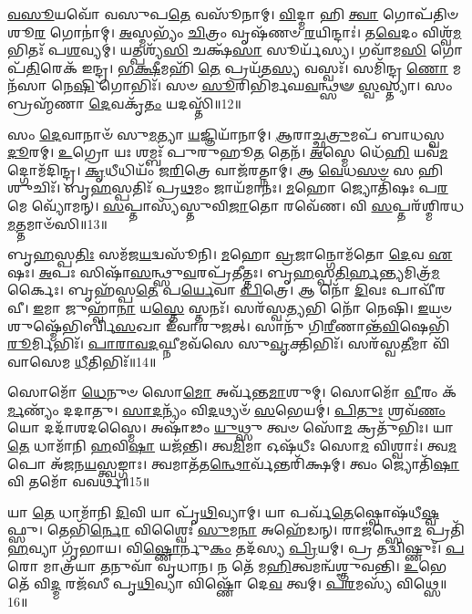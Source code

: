 \-\ul{𑌵}\-\-\ul{𑌸𑍂}\-𑌯𑌵𑍋᳴ 𑌵𑌸𑍁𑌪\-\ul{𑌤𑍇} 𑌵𑌸𑍂᳴𑌨𑌾𑌮𑍍।
\-\ul{𑌵𑌿}\-𑌦𑍍𑌮𑌾 𑌹𑌿 \ul{𑌤𑍍𑌵𑌾} 𑌗𑍋𑌪᳴𑌤𑌿𑍞 𑌶𑍂\-\ul{𑌰} 𑌗𑍋𑌨𑌾॑𑌮𑍍।
\-\ul{𑌅}\-𑌸𑍍𑌮𑌭𑍍𑌯𑌂᳴ \ul{𑌚𑌿}\-𑌤𑍍𑌰𑌂 𑌵𑍃𑌷᳴𑌣𑍞 \ul{𑌰}\-𑌯𑌿𑌨𑍍𑌦𑌾𑌃॑।
𑌤\-\ul{𑌵𑍇}\-𑌦𑌂 𑌵𑌿𑌶𑍍𑌵᳴\-\ul{𑌮}\-𑌭𑌿𑌤𑌃᳴ 𑌪\-\ul{𑌶}\-𑌵𑍍𑌯𑌮𑍍॑।
𑌯𑌤𑍍𑌪𑌶𑍍𑌯᳴\-\ul{𑌸𑌿} 𑌚𑌕𑍍𑌷᳴\-\ul{𑌸𑌾} 𑌸𑍂𑌰𑍍𑌯᳴𑌸𑍍𑌯।
𑌗𑌵𑌾᳴𑌮\-\ul{𑌸𑌿} 𑌗𑍋𑌪᳴\-\ul{𑌤𑌿}\-𑌰𑍇𑌕᳴ 𑌇𑌨𑍍𑌦𑍍𑌰।
\-\ul{𑌭}\-\-\ul{𑌕𑍍𑌷𑍀}\-𑌮𑌹𑌿᳴ \ul{𑌤𑍇} 𑌪𑍍𑌰𑌯᳴𑌤\-\ul{𑌸𑍍𑌯} 𑌵𑌸𑍍𑌵𑌃᳴।
𑌸𑌮𑌿᳴𑌨𑍍𑌦𑍍𑌰 \ul{𑌣𑍋} 𑌮𑌨᳴𑌸𑌾 𑌨𑍇\-\ul{𑌷𑌿} 𑌗𑍋𑌭𑌿𑌃᳴।
𑌸𑍞 \ul{𑌸𑍂}\-𑌰𑌿𑌭𑌿᳴𑌰𑍍𑌮𑌘\-\ul{𑌵}\-𑌨𑍍𑌥𑍍𑌸𑍟 \ul{𑌸𑍍𑌵}\-𑌸𑍍𑌤𑍍𑌯𑌾।
𑌸𑌂 𑌬𑍍𑌰𑌹𑍍𑌮᳴𑌣𑌾 \ul{𑌦𑍇}\-𑌵𑌕𑍃᳴\-\ul{𑌤𑌂} 𑌯𑌦𑌸𑍍𑌤𑌿᳴॥12॥

𑌸𑌂 \ul{𑌦𑍇}\-𑌵𑌾𑌨𑌾𑍞᳴ 𑌸𑍁\-\ul{𑌮}\-𑌤𑍍𑌯𑌾 \ul{𑌯}\-𑌜𑍍𑌞𑌿𑌯𑌾᳴𑌨𑌾𑌮𑍍।
\-\ul{𑌆}\-𑌰𑌾𑌚𑍍𑌛\-\ul{𑌤𑍍𑌰𑍁}\-𑌮𑌪᳴ 𑌬𑌾𑌧𑌸𑍍𑌵 \ul{𑌦𑍂}\-𑌰𑌮𑍍।
\-\ul{𑌉}\-𑌗𑍍𑌰𑍋 𑌯𑌃 𑌶𑌮𑍍𑌬𑌃᳴ 𑌪𑍁𑌰𑍁𑌹𑍂\-\ul{𑌤} 𑌤𑍇𑌨᳴।
\-\ul{𑌅}\-𑌸𑍍𑌮𑍇 𑌧𑍇᳴\-\ul{𑌹𑌿} 𑌯𑌵᳴\-\ul{𑌮}\-𑌦𑍍𑌗𑍋𑌮᳴𑌦𑌿𑌨𑍍𑌦𑍍𑌰।
\-\ul{𑌕𑍃}\-𑌧𑍀𑌧𑌿𑌯𑌂᳴ 𑌜\-\ul{𑌰𑌿}\-𑌤𑍍𑌰𑍇 𑌵𑌾𑌜᳴𑌰𑌤𑍍𑌨𑌾𑌮𑍍।
𑌆 \ul{𑌵𑍇}\-𑌧\-\ul{𑌸}\-\-\ul{𑍞} 𑌸 𑌹𑌿 𑌶𑍁𑌚𑌿𑌃᳴।
𑌬𑍃\-\ul{𑌹}\-𑌸𑍍𑌪𑌤𑌿𑌃᳴ 𑌪𑍍𑌰\-\ul{𑌥}\-𑌮𑌂 𑌜𑌾𑌯᳴𑌮𑌾𑌨𑌃।
\-\ul{𑌮}\-𑌹𑍋 𑌜𑍍𑌯𑍋𑌤𑌿᳴𑌷𑌃 𑌪\-\ul{𑌰}\-𑌮𑍇 𑌵𑍍𑌯𑍋᳴𑌮𑌨𑍍।
\-\ul{𑌸}\-𑌪𑍍𑌤𑌾𑌸𑍍𑌯᳴𑌸𑍍𑌤𑍁𑌵𑌿\-\ul{𑌜𑌾}\-𑌤𑍋 𑌰𑌵𑍇᳴𑌣।
𑌵𑌿 \ul{𑌸}\-𑌪𑍍𑌤𑌰᳴𑌶𑍍𑌮𑌿𑌰𑌧\-\ul{𑌮}\-𑌤𑍍𑌤𑌮𑌾𑍞᳴𑌸𑌿॥13॥

𑌬𑍃\-\ul{𑌹}\-𑌸𑍍𑌪\-\ul{𑌤𑌿𑌃} 𑌸𑌮᳴𑌜\-\ul{𑌯}\-𑌦𑍍𑌵𑌸𑍂᳴𑌨𑌿।
\-\ul{𑌮}\-𑌹𑍋 \ul{𑌵𑍍𑌰}\-𑌜𑌾𑌨𑍍𑌗𑍋𑌮᳴𑌤𑍋 \ul{𑌦𑍇}\-𑌵 \ul{𑌏}\-𑌷𑌃।
\-\ul{𑌅}\-𑌪𑌃 𑌸𑌿𑌷𑌾᳴\-\ul{𑌸}\-𑌨𑍍𑌥𑍍𑌸𑍁\-\ul{𑌵}\-𑌰𑌪𑍍𑌰᳴𑌤𑍀𑌤𑍍𑌤𑌃।
𑌬𑍃\-\ul{𑌹}\-𑌸𑍍𑌪\-\ul{𑌤𑌿}\-\-\ul{𑌰𑍍}\-𑌹\-\ul{𑌨𑍍𑌤𑍍𑌯}\-𑌮𑌿𑌤𑍍𑌰᳴\-\ul{𑌮}\-𑌰𑍍𑌕𑍈𑌃।
𑌬𑍃𑌹᳴𑌸𑍍𑌪\-\ul{𑌤𑍇} 𑌪\-\ul{𑌰𑍍𑌯𑍇}\-𑌵𑌾 \ul{𑌪𑌿}\-𑌤𑍍𑌰𑍇।
𑌆 𑌨𑍋᳴ \ul{𑌦𑌿}\-𑌵𑌃 𑌪𑌾𑌵𑍀᳴𑌰𑌵𑍀।
\-\ul{𑌇}\-𑌮𑌾 𑌜𑍁𑌹𑍍𑌵𑌾᳴\-\ul{𑌨𑌾} 𑌯\-\ul{𑌸𑍍𑌤𑍇} 𑌸𑍍𑌤𑌨𑌃᳴।
𑌸𑌰᳴𑌸𑍍𑌵\-\ul{𑌤𑍍𑌯}\-𑌭𑌿 𑌨𑍋᳴ 𑌨𑍇𑌷𑌿।
\-\ul{𑌇}\-𑌯𑍞 𑌶𑍁𑌷𑍍𑌮𑍇᳴𑌭𑌿𑌰𑍍𑌬𑌿\-\ul{𑌸}\-𑌖𑌾 𑌇᳴𑌵𑌾𑌰𑍁𑌜𑌤𑍍।
𑌸𑌾𑌨𑍁᳴ 𑌗𑌿\-\ul{𑌰𑍀}\-𑌣𑌾𑌨𑍍𑌤᳴\-\ul{𑌵𑌿}\-𑌷𑍇𑌭𑌿᳴\-\ul{𑌰𑍂}\-𑌰𑍍𑌮𑌿𑌭𑌿𑌃᳴।
\-\ul{𑌪𑌾}\-\-\ul{𑌰𑌾}\-\-\ul{𑌵}\-\-\ul{𑌦}\-𑌘𑍍𑌨𑍀𑌮𑌵᳴𑌸𑍇 𑌸𑍁\-\ul{𑌵𑍃}\-𑌕𑍍𑌤𑌿𑌭𑌿𑌃᳴।
𑌸𑌰᳴𑌸𑍍𑌵\-\ul{𑌤𑍀}\-𑌮𑌾 𑌵𑌿᳴𑌵𑌾𑌸𑍇𑌮 \ul{𑌧𑍀}\-𑌤𑌿𑌭𑌿𑌃᳴॥14॥\anuvakamend[\-\ul{𑌦𑍇}\-\-\ul{𑌵}\-𑌯𑌾𑌨𑍈॑\-\ul{𑌰𑍍𑌦𑍇}\-𑌵𑌾𑌃 𑌸𑍁𑌪𑍂᳴𑌤𑌂 𑌯𑌜\-\ul{𑌤𑍍𑌰} 𑌹\-\ul{𑌸𑍍𑌤}\-𑌮\-\ul{𑌸𑍍𑌤𑌿} 𑌤𑌮𑌾𑍟᳴\-\ul{𑌸𑍍𑌯𑍂}\-𑌰𑍍𑌮𑌿\-\ul{𑌭𑌿}\-𑌰𑍍𑌦𑍍𑌵𑍇 𑌚᳴]

𑌸𑍋𑌮𑍋᳴ \ul{𑌧𑍇}\-𑌨𑍁𑍞 𑌸𑍋\-\ul{𑌮𑍋} 𑌅𑌰𑍍𑌵᳴𑌨𑍍𑌤\-\ul{𑌮𑌾}\-𑌶𑍁𑌮𑍍।
𑌸𑍋𑌮𑍋᳴ \ul{𑌵𑍀}\-𑌰𑌂 𑌕᳴\-\ul{𑌰𑍍𑌮}\-𑌣𑍍𑌯𑌂᳴ 𑌦𑌦𑌾𑌤𑍁।
\-\ul{𑌸𑌾}\-\-\ul{𑌦}\-𑌨𑍍𑌯𑌂᳴ 𑌵𑌿\-\ul{𑌦}\-𑌥𑍍𑌯𑍞᳴ \ul{𑌸}\-𑌭𑍇𑌯𑌮𑍍॑।
\-\ul{𑌪𑌿}\-\-\ul{𑌤𑍁𑌃} 𑌶𑍍𑌰𑌵᳴\-\ul{𑌣𑌂} 𑌯𑍋 𑌦𑌦𑌾᳴𑌶𑌦𑌸𑍍𑌮𑍈।
𑌅𑌷𑌾᳴𑌢𑌂 \ul{𑌯𑍁}\-𑌥𑍍𑌸𑍁 𑌤𑍍𑌵𑍞 𑌸𑍋᳴\-\ul{𑌮} 𑌕𑍍𑌰𑌤𑍁᳴𑌭𑌿𑌃।
𑌯𑌾 \ul{𑌤𑍇} 𑌧𑌾𑌮𑌾᳴𑌨𑌿 \ul{𑌹}\-𑌵𑌿\-\ul{𑌷𑌾} 𑌯𑌜᳴𑌨𑍍𑌤𑌿।
𑌤𑍍𑌵\-\ul{𑌮𑌿}\-𑌮𑌾 𑌓𑌷᳴𑌧𑍀𑌃 𑌸𑍋\-\ul{𑌮} 𑌵𑌿𑌶𑍍𑌵𑌾𑌃॑।
𑌤𑍍𑌵\-\ul{𑌮}\-𑌪𑍋 𑌅᳴𑌜𑌨\-\ul{𑌯}\-𑌸𑍍𑌤𑍍𑌵𑌙𑍍𑌗𑌾𑌃।
𑌤𑍍𑌵𑌮𑌾𑌤᳴𑌤\-\ul{𑌨𑍍𑌥𑍋}\-𑌰𑍍𑌵᳴𑌨𑍍𑌤𑌰𑌿᳴𑌕𑍍𑌷𑌮𑍍।
𑌤𑍍𑌵𑌂 𑌜𑍍𑌯𑍋𑌤𑌿᳴\-\ul{𑌷𑌾} 𑌵𑌿 𑌤𑌮𑍋᳴ 𑌵𑌵𑌰𑍍𑌥॥15॥

𑌯𑌾 \ul{𑌤𑍇} 𑌧𑌾𑌮𑌾᳴𑌨𑌿 \ul{𑌦𑌿}\-𑌵𑌿 𑌯𑌾 𑌪𑍃᳴\-\ul{𑌥𑌿}\-𑌵𑍍𑌯𑌾𑌮𑍍।
𑌯𑌾 𑌪𑌰𑍍𑌵᳴\-\ul{𑌤𑍇}\-𑌷𑍍𑌵𑍋𑌷᳴𑌧𑍀\-\ul{𑌷𑍍𑌵}\-𑌫𑍍𑌸𑍁।
𑌤𑍇𑌭𑌿᳴\-\ul{𑌰𑍍𑌨𑍋} 𑌵𑌿𑌶𑍍𑌵𑍈𑌃॑ \ul{𑌸𑍁}\-𑌮\-\ul{𑌨𑌾} 𑌅𑌹𑍇᳴𑌡𑌨𑍍।
𑌰𑌾𑌜॑𑌨𑍍𑌥𑍍𑌸𑍋\-\ul{𑌮} 𑌪𑍍𑌰𑌤𑌿᳴ \ul{𑌹}\-𑌵𑍍𑌯𑌾 𑌗𑍃᳴𑌭𑌾𑌯।
𑌵𑌿\-\ul{𑌷𑍍𑌣𑍋}\-𑌰𑍍𑌨𑍁\-\ul{𑌕𑌂} 𑌤𑌦᳴𑌸𑍍𑌯 \ul{𑌪𑍍𑌰𑌿}\-𑌯𑌮𑍍।
𑌪𑍍𑌰 𑌤𑌦𑍍𑌵𑌿𑌷𑍍𑌣𑍁𑌃᳴।
\-\ul{𑌪}\-𑌰𑍋 𑌮𑌾𑌤𑍍𑌰᳴𑌯𑌾 \ul{𑌤}\-𑌨𑍁𑌵𑌾᳴ 𑌵𑍃𑌧𑌾𑌨।
𑌨 𑌤𑍇᳴ 𑌮\-\ul{𑌹𑌿}\-𑌤𑍍𑌵𑌮𑌨𑍍𑌵᳴𑌶𑍍𑌞𑍁𑌵𑌨𑍍𑌤𑌿।
\-\ul{𑌉}\-𑌭𑍇 𑌤𑍇᳴ 𑌵𑌿\-\ul{𑌦𑍍𑌮} 𑌰𑌜᳴𑌸𑍀 𑌪𑍃\-\ul{𑌥𑌿}\-𑌵𑍍𑌯𑌾 𑌵𑌿𑌷𑍍𑌣𑍋᳴ 𑌦𑍇\-\ul{𑌵} 𑌤𑍍𑌵𑌮𑍍।
\-\ul{𑌪}\-\-\ul{𑌰}\-𑌮𑌸𑍍𑌯᳴ 𑌵𑌿𑌥𑍍𑌸𑍇॥16॥

